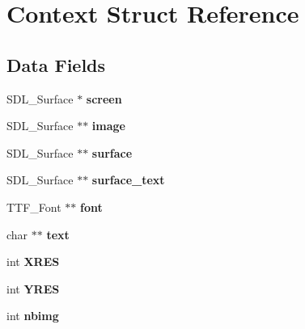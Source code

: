\hypertarget{struct_context}{
\section{Context Struct Reference}
\label{struct_context}
}
\subsection*{Data Fields}
\begin{DoxyCompactItemize}
\item 
\hypertarget{struct_context_a968bba55c7ad32b326939fefd1bbb017}{
SDL\_\-Surface $\ast$ {\bfseries screen}}
\label{struct_context_a968bba55c7ad32b326939fefd1bbb017}

\item 
\hypertarget{struct_context_af2afe24718b0dd7e5627145b6f2835ea}{
SDL\_\-Surface $\ast$$\ast$ {\bfseries image}}
\label{struct_context_af2afe24718b0dd7e5627145b6f2835ea}

\item 
\hypertarget{struct_context_ad05517fedd10dabf364c071e51a221cd}{
SDL\_\-Surface $\ast$$\ast$ {\bfseries surface}}
\label{struct_context_ad05517fedd10dabf364c071e51a221cd}

\item 
\hypertarget{struct_context_aa0b605abc971da3653ff87f90a63bcd1}{
SDL\_\-Surface $\ast$$\ast$ {\bfseries surface\_\-text}}
\label{struct_context_aa0b605abc971da3653ff87f90a63bcd1}

\item 
\hypertarget{struct_context_a18b012fd97f2d518ab08acde37943e57}{
TTF\_\-Font $\ast$$\ast$ {\bfseries font}}
\label{struct_context_a18b012fd97f2d518ab08acde37943e57}

\item 
\hypertarget{struct_context_a2049241e3a33ff97a3729be08d729a20}{
char $\ast$$\ast$ {\bfseries text}}
\label{struct_context_a2049241e3a33ff97a3729be08d729a20}

\item 
\hypertarget{struct_context_a179109d7e24bfa10690d72e592d4cc69}{
int {\bfseries XRES}}
\label{struct_context_a179109d7e24bfa10690d72e592d4cc69}

\item 
\hypertarget{struct_context_ac743bd0100425fd267953f6439704b8e}{
int {\bfseries YRES}}
\label{struct_context_ac743bd0100425fd267953f6439704b8e}

\item 
\hypertarget{struct_context_ae9c72209fc2ffd565ab97792f01e0c08}{
int {\bfseries nbimg}}
\label{struct_context_ae9c72209fc2ffd565ab97792f01e0c08}


\end{DoxyCompactItemize}
